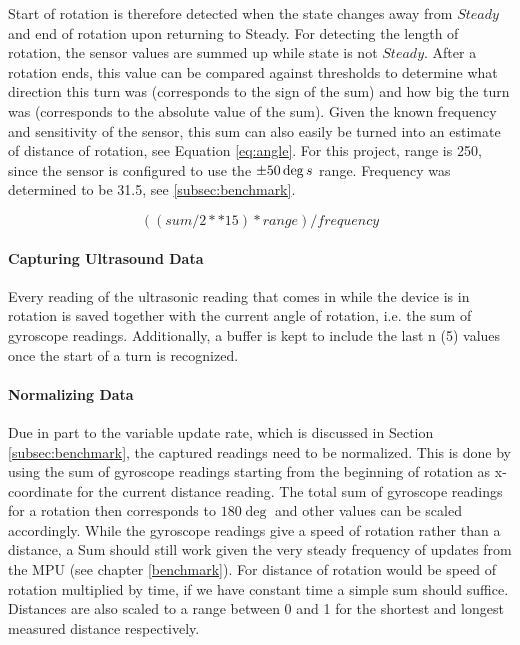 Start of rotation is therefore detected when the state changes away from $Steady$ and end of rotation upon returning to Steady.
For detecting the length of rotation, the sensor values are summed up while state is not $Steady$.
After a rotation ends, this value can be compared against thresholds to determine what direction this turn was (corresponds to the sign of the sum) and how big the turn was (corresponds to the absolute value of the sum).
Given the known frequency and sensitivity of the sensor, this sum can also easily be turned into an estimate of distance of rotation, see Equation \ref{eq:angle}. For this project, range is 250, since the sensor is configured to use the $\pm50\deg\\s$ range. Frequency was determined to be 31.5, see \ref{subsec:benchmark}.

\begin{equation}
    ((sum / 2 ** 15) * range) / frequency
    \label{eq:angle}
\end{equation}


\paragraph{Capturing Ultrasound Data}
Every reading of the ultrasonic reading that comes in while the device is in rotation is saved together with the current angle of rotation, i.e. the sum of gyroscope readings. Additionally, a buffer is kept to include the last n (5) values once the start of a turn is recognized.

\paragraph{Normalizing Data}
Due in part to the variable update rate, which is discussed in Section \ref{subsec:benchmark}, the captured readings need to be normalized.
This is done by using the sum of gyroscope readings starting from the beginning of rotation as x-coordinate for the current distance reading.
The total sum of gyroscope readings for a rotation then corresponds to $180\deg$ and other values can be scaled accordingly.
While the gyroscope readings give a speed of rotation rather than a distance, a Sum should still work given the very steady frequency of updates from the MPU (see chapter \ref{benchmark}).
For distance of rotation would be speed of rotation multiplied by time, if we have constant time a simple sum should suffice.
Distances are also scaled to a range between 0 and 1 for the shortest and longest measured distance respectively.

